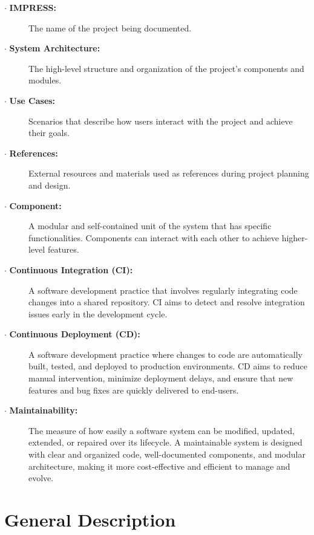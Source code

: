 \documentclass{report}
\begin{document}
\begin{description}
    \item[$\cdot$ \textbf{IMPRESS:}] The name of the project being documented.
    
    \item[$\cdot$ \textbf{System Architecture:}] The high-level structure and organization of the project's components and modules.
    
    \item[$\cdot$ \textbf{Use Cases:}] Scenarios that describe how users interact with the project and achieve their goals.
        
    \item[$\cdot$ \textbf{References:}] External resources and materials used as references during project planning and design.

    \item[$\cdot$ \textbf{Component:}] A modular and self-contained unit of the system that has specific functionalities. Components can interact with each other to achieve higher-level features.

    \item[$\cdot$ \textbf{Continuous Integration (CI):}] A software development practice that involves regularly integrating code changes into a shared repository. CI aims to detect and resolve integration issues early in the development cycle.

    \item[$\cdot$ \textbf{Continuous Deployment (CD):}] A software development practice where changes to code are automatically built, tested, and deployed to production environments. CD aims to reduce manual intervention, minimize deployment delays, and ensure that new features and bug fixes are quickly delivered to end-users.

    \item[$\cdot$ \textbf{Maintainability:}] The measure of how easily a software system can be modified, updated, extended, or repaired over its lifecycle. A maintainable system is designed with clear and organized code, well-documented components, and modular architecture, making it more cost-effective and efficient to manage and evolve.

\end{description}



\chapter{General Description}
\end{document}
